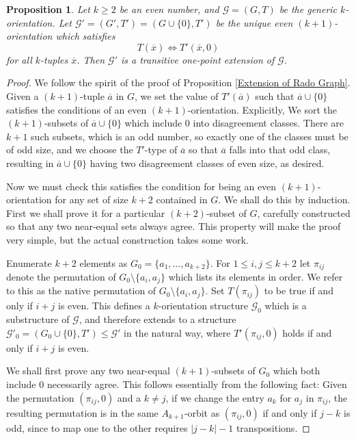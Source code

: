 \documentclass{amsart}
\newtheorem{proposition}[theorem]{Proposition}
\def\graph{\mathcal{G}}
\newcommand{\set}[1]{\{#1 \}}
\begin{document}
\begin{proposition}\label{even half of Orientation Theorem}
    Let $k \geq 2$ be an even number, and $\graph = (G, T)$ be the generic $k$-orientation. Let $\graph' = (G', T') = (G \cup \set{0}, T')$ be the unique even $(k+1)$-orientation which satisfies
    $$T(\overline{x}) \Leftrightarrow T'(\overline{x}, 0)$$
    for all $k$-tuples $\overline{x}$. Then $\graph'$ is a transitive one-point extension of $\graph$.
\end{proposition}
\begin{proof}
    We follow the spirit of the proof of Proposition \ref{Extension of Rado Graph}. Given a $(k+1)$-tuple $\overline{a}$ in $G$, we set the value of $T'(\overline{a})$ such that $\overline{a}\cup\set{0}$ satisfies the conditions of an even $(k+1)$-orientation. Explicitly, We sort the $(k+1)$-subsets of $\overline{a}\cup\set{0}$ which include 0 into disagreement classes. There are $k+1$ such subsets, which is an odd number, so exactly one of the classes must be of odd size, and we choose the $T'$-type of $\overline{a}$ so that $\overline{a}$ falls into that odd class, resulting in $\overline{a}\cup \{0\}$ having two disagreement classes of even size, as desired.

    Now we must check this satisfies the condition for being an even $(k+1)$-orientation for any set of size $k+2$ contained in $G$. We shall do this by induction. First we shall prove it for a particular $(k+2)$-subset of $G$, carefully constructed so that any two near-equal sets always agree. This property will make the proof very simple, but the actual construction takes some work.
    
    Enumerate $k+2$ elements as $G_0 = \set{a_1, \dots, a_{k+2}}$. For $1 \leq i, j\leq k+2$ let $\pi_{i j}$ denote the permutation of $G_0 \setminus \set{a_i, a_j}$ which lists its elements in order. We refer to this as the native permutation of $G_0 \setminus \set{a_i, a_j}$. Set $T(\pi_{ij})$ to be true if and only if $i+j$ is even. This defines a $k$-orientation structure $\graph_0$ which is a substructure of $\graph$, and therefore extends to a structure $\graph'_0 = (G_0\cup\set{0}, T') \leq \graph'$ in the natural way, where $T'(\pi_{ij}, 0)$ holds if and only if $i + j$ is even.

    We shall first prove any two near-equal $(k+1)$-subsets of $G_0$ which both include 0 necessarily agree. This follows essentially from the following fact: Given the permutation $(\pi_{ij}, 0)$ and a $k \neq j$, if we change the entry $a_k$ for $a_j$ in $\pi_{ij}$, the resulting permutation is in the same $A_{k+1}$-orbit as $(\pi_{ij}, 0)$ if and only if $j-k$ is odd, since to map one to the other requires $|j-k|-1$ transpositions. 
    

\end{proof}
\end{document}
